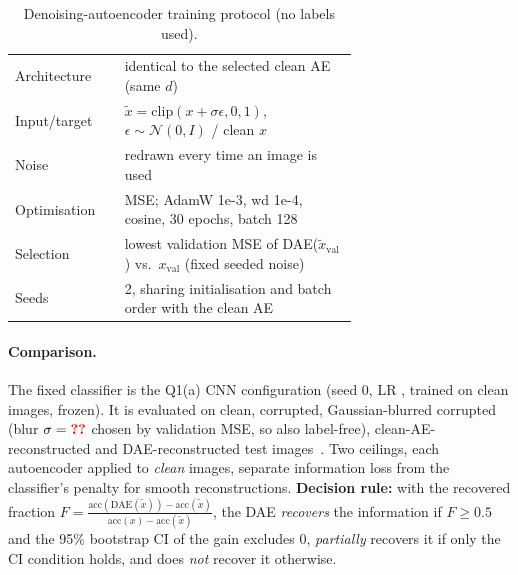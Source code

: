 \begin{table}[t]
\centering\footnotesize\setlength{\tabcolsep}{3pt}
\caption{Denoising-autoencoder training protocol (no labels used).}
\label{tab:q3proto}
\begin{tabular}{@{}lp{0.68\linewidth}@{}}
\toprule
Architecture & identical to the selected clean AE (same $d$) \\
Input/target & $\tilde x=\mathrm{clip}(x+\sigma\epsilon,0,1)$, $\epsilon\sim\mathcal N(0,I)$ / clean $x$ \\
Noise & redrawn every time an image is used \\
Optimisation & MSE; AdamW 1e-3, wd 1e-4, cosine, 30 epochs, batch 128 \\
Selection & lowest validation MSE of DAE($\tilde x_\text{val}$) vs.\ $x_\text{val}$ (fixed seeded noise) \\
Seeds & 2, sharing initialisation and batch order with the clean AE \\
\bottomrule
\end{tabular}
\end{table}

\paragraph{Comparison.} The fixed classifier is the Q1(a) CNN configuration (seed 0, LR , trained on clean
images, frozen). 
It is evaluated on clean, corrupted, Gaussian-blurred corrupted (blur $\sigma=\res{q3.blur}$ chosen by validation MSE, so
also label-free), clean-AE-reconstructed and DAE-reconstructed test images~\cite{vincent2008extracting}. Two ceilings, each
autoencoder applied to \emph{clean} images, separate information loss from the classifier's penalty for smooth
reconstructions. \textbf{Decision rule:} with the recovered fraction
$F=\frac{\mathrm{acc}(\mathrm{DAE}(\tilde x))-\mathrm{acc}(\tilde x)}{\mathrm{acc}(x)-\mathrm{acc}(\tilde x)}$, the DAE
\emph{recovers} the information if $F\geq0.5$ and the 95\% bootstrap CI of the gain excludes 0, \emph{partially} recovers it if
only the CI condition holds, and does \emph{not} recover it otherwise.

